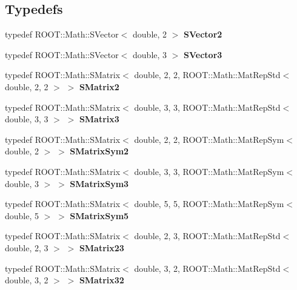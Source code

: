 \subsection*{Typedefs}
\begin{DoxyCompactItemize}
\item 
typedef R\+O\+O\+T\+::\+Math\+::\+S\+Vector$<$ double, 2 $>$ \textbf{ S\+Vector2}
\item 
typedef R\+O\+O\+T\+::\+Math\+::\+S\+Vector$<$ double, 3 $>$ \textbf{ S\+Vector3}
\item 
typedef R\+O\+O\+T\+::\+Math\+::\+S\+Matrix$<$ double, 2, 2, R\+O\+O\+T\+::\+Math\+::\+Mat\+Rep\+Std$<$ double, 2, 2 $>$ $>$ \textbf{ S\+Matrix2}
\item 
typedef R\+O\+O\+T\+::\+Math\+::\+S\+Matrix$<$ double, 3, 3, R\+O\+O\+T\+::\+Math\+::\+Mat\+Rep\+Std$<$ double, 3, 3 $>$ $>$ \textbf{ S\+Matrix3}
\item 
typedef R\+O\+O\+T\+::\+Math\+::\+S\+Matrix$<$ double, 2, 2, R\+O\+O\+T\+::\+Math\+::\+Mat\+Rep\+Sym$<$ double, 2 $>$ $>$ \textbf{ S\+Matrix\+Sym2}
\item 
typedef R\+O\+O\+T\+::\+Math\+::\+S\+Matrix$<$ double, 3, 3, R\+O\+O\+T\+::\+Math\+::\+Mat\+Rep\+Sym$<$ double, 3 $>$ $>$ \textbf{ S\+Matrix\+Sym3}
\item 
typedef R\+O\+O\+T\+::\+Math\+::\+S\+Matrix$<$ double, 5, 5, R\+O\+O\+T\+::\+Math\+::\+Mat\+Rep\+Sym$<$ double, 5 $>$ $>$ \textbf{ S\+Matrix\+Sym5}
\item 
typedef R\+O\+O\+T\+::\+Math\+::\+S\+Matrix$<$ double, 2, 3, R\+O\+O\+T\+::\+Math\+::\+Mat\+Rep\+Std$<$ double, 2, 3 $>$ $>$ \textbf{ S\+Matrix23}
\item 
typedef R\+O\+O\+T\+::\+Math\+::\+S\+Matrix$<$ double, 3, 2, R\+O\+O\+T\+::\+Math\+::\+Mat\+Rep\+Std$<$ double, 3, 2 $>$ $>$ \textbf{ S\+Matrix32}
\end{DoxyCompactItemize}
